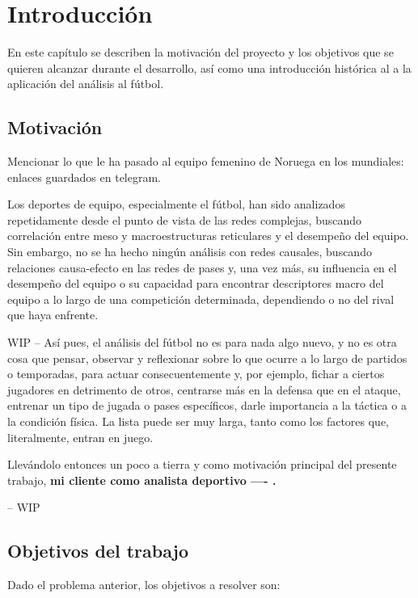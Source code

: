 \chapter{Introducción}

En este capítulo se describen la motivación del proyecto y los objetivos que
se quieren alcanzar durante el desarrollo, así como una introducción histórica al
a la aplicación del análisis al fútbol. 

\section{Motivación}

Mencionar lo que le ha pasado al equipo femenino de Noruega en los 
mundiales: enlaces guardados en telegram.

Los deportes de equipo, especialmente el fútbol, han sido analizados 
repetidamente desde el punto de vista de las redes complejas, buscando 
correlación entre meso y macroestructuras reticulares y el desempeño del 
equipo. Sin embargo, no se ha hecho ningún análisis con redes causales, 
buscando relaciones causa-efecto en las redes de pases y, una vez más, 
su influencia en el desempeño del equipo o su capacidad para encontrar 
descriptores macro del equipo a lo largo de una competición determinada, 
dependiendo o no del rival que haya enfrente.

WIP --
Así pues, el análisis del fútbol no es para nada algo nuevo, y no es otra cosa que 
pensar, observar y reflexionar sobre lo que ocurre a lo largo de partidos 
o temporadas, para actuar consecuentemente y, por ejemplo, fichar a 
ciertos jugadores en detrimento de otros, centrarse más en la defensa 
que en el ataque, entrenar un tipo de jugada o pases específicos, darle 
importancia a la táctica o a la condición física. La lista puede ser muy 
larga, tanto como los factores que, literalmente, entran en juego.

Llevándolo entonces un poco a tierra y como motivación principal del presente trabajo,
\textbf{mi cliente como analista deportivo ---- .}



-- WIP 

\section{Objetivos del trabajo} \label{sect:goals}

Dado el problema anterior, los objetivos a resolver son:

